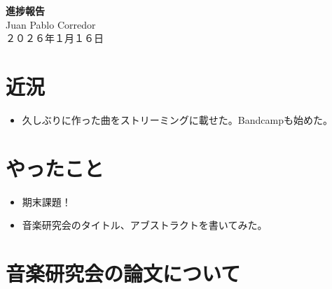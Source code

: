 \documentclass[a4paper, 11pt]{article}
\begin{document}
\begin{center}
    {\LARGE \bfseries 進捗報告} \\ %
    \vspace{0.3em} %
    Juan Pablo Corredor \\ %
    ２０２６年１月１６日 %
\end{center}
\vspace{0.5em} %

\section*{近況}
\begin{itemize}
    \item 久しぶりに作った曲をストリーミングに載せた。Bandcampも始めた。
\end{itemize}

\section*{やったこと}
\begin{itemize} 
    \item 期末課題！
    \item 音楽研究会のタイトル、アブストラクトを書いてみた。
\end{itemize}

\section*{音楽研究会の論文について}
\end{document}
